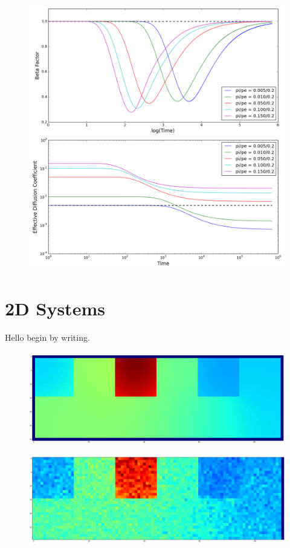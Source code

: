 	\begin{figure}[h]
		\centering
		\includegraphics[width=1.0\linewidth]{../images/1D/pipe_beta_deff_1D}
		\caption{}
		\label{fig:pipe_beta_deff_1D}
	\end{figure}

\newpage
\section{2D Systems}
\label{sec:ra-2D}

	Hello begin by writing.
	\begin{figure}[h]
		\centering
		\includegraphics[width=1.0\linewidth]{../images/2D/heterogeneous_3U_2D}
		\caption{}
		\label{fig:heterogeneous_3U_2D}
	\end{figure}
	
	\begin{figure}[h]
		\centering
		\includegraphics[width=1.0\linewidth]{../images/2D/MC_heterogeneous_3U_2D}
		\caption{}
		\label{fig:MC_heterogeneous_3U_2D}
	\end{figure}
	
